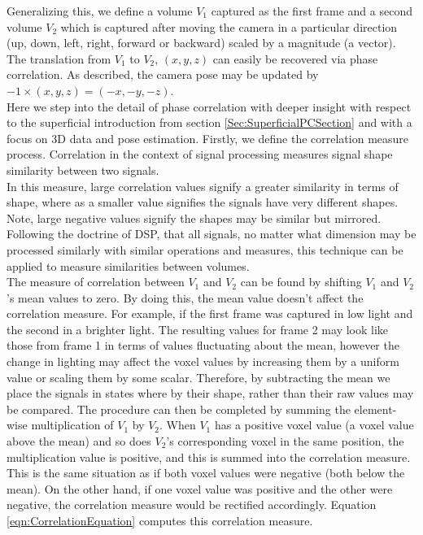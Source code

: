 Generalizing this, we define a volume $V_1$ captured as the first frame and a second volume $V_2$ which is captured after moving the camera in a particular direction (up, down, left, right, forward or backward) scaled by a magnitude (a vector). The translation from $V_1$ to $V_2$, $(x,y,z)$ can easily be recovered via phase correlation. As described, the camera pose may be updated by $-1 \times (x,y,z) = (-x,-y,-z)$. \\

Here we step into the detail of phase correlation with deeper insight with respect to the superficial introduction from section \ref{Sec:SuperficialPCSection} and with a focus on 3D data and pose estimation. Firstly, we define the correlation measure process. Correlation in the context of signal processing measures signal shape similarity between two signals. \\

In this measure, large correlation values signify a greater similarity in terms of shape, where as a smaller value signifies the signals have very different shapes. Note, large negative values signify the shapes may be similar but mirrored. Following the doctrine of DSP, that all signals, no matter what dimension may be processed similarly with similar operations and measures, this technique can be applied to measure similarities between volumes.  \\

The measure of correlation between $V_1$ and $V_2$ can be found by shifting $V_1$ and $V_2$'s mean values to zero. By doing this, the mean value doesn't affect the correlation measure. For example, if the first frame was captured in low light and the second in a brighter light. The resulting values for frame 2 may look like those from frame 1 in terms of values fluctuating about the mean, however the change in lighting may affect the voxel values by increasing them by a uniform value or scaling them by some scalar. Therefore, by subtracting the mean we place the signals in states where by their shape, rather than their raw values may be compared. The procedure can then be completed by summing the element-wise multiplication of $V_1$ by $V_2$. When $V_1$ has a positive voxel value (a voxel value above the mean) and so does $V_2$'s corresponding voxel in the same position, the multiplication value is positive, and this is summed into the correlation measure. This is the same situation as if both voxel values were negative (both below the mean). On the other hand, if one voxel value was positive and the other were negative, the correlation measure would be rectified accordingly. Equation \ref{eqn:CorrelationEquation} computes this correlation measure. 

